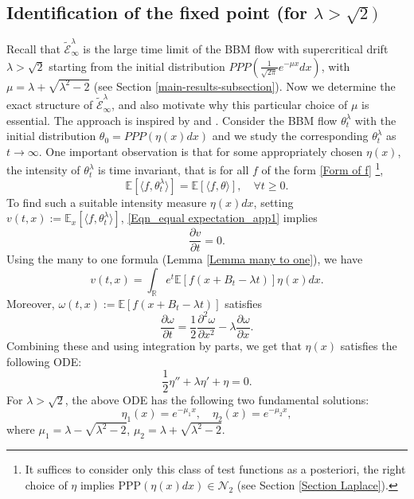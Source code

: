 \documentclass[a4paper,reqno]{amsart}%
\newcommand{\1}{\mathbf 1}
\theoremstyle{mine}
\numberwithin{theorem}{section}
\numberwithin{equation}{section}
\theoremstyle{remark}
\begin{document}
\subsection{Identification of the fixed point (for $\lambda>\sqrt 2)$}\label{sec3}
Recall that $\widetilde{\mathcal E}_\infty^\lambda$ is the large time limit of the BBM flow with supercritical drift $\lambda>\sqrt 2$ starting from the initial distribution  $ PPP(\frac{1}{\sqrt{2\pi}}e^{-\mu x } dx)$, with $\mu=\lambda+\sqrt{\lambda^2-2}$ (see Section \ref{main-results-subsection}). 
Now we determine the exact structure of $\widetilde{\mathcal E}_\infty^\lambda$, and also motivate why this particular choice of $\mu$ is essential.
The approach is inspired by \cite{Lalley_Sellke} and \cite{Kabluchko}. 
Consider the BBM flow $\theta_t^\lambda$ with the initial distribution $\theta_0= PPP(\eta(x)dx)$ and we study the corresponding $\theta^\lambda_{t}$ as $t\to\infty$.
One important observation is that for some appropriately chosen $\eta(x)$, the intensity of $\theta^\lambda_t$ is time invariant, that is 
for all $f$ of the form \eqref{Form of f} \footnote{It suffices to consider only this class of test functions as a posteriori, the right choice of $\eta$ implies PPP$(\eta(x)dx)\in \mathcal N_2$ (see Section \ref{Section Laplace}).},
\begin{equation}\label{Eqn_equal expectation_app1}
  \mathbb{E} [\langle f,\theta_{t}^{\lambda}\rangle] = \mathbb{E} [\langle f, \theta\rangle ], \quad \forall t \ge 0.
\end{equation}
To find such a suitable intensity measure $\eta(x)dx$, setting $v(t,x) := \mathbb{E}_x [\langle f, \theta_{t}^{\lambda}\rangle ]$, \eqref{Eqn_equal expectation_app1} implies
\begin{equation}\label{3.3'}
  \frac{\partial v}{\partial t} = 0.
\end{equation}
Using the many to one formula (Lemma \ref{Lemma many to one}), we have 
\begin{equation}
  v(t,x) = \int_{\mathbb{R}}e^{t}\mathbb{E}[f(x+B_{t}-\lambda t)]\eta(x)dx.
\end{equation}
Moreover, $\omega(t,x) := \mathbb{E}[f(x+B_{t}-\lambda t)]$ satisfies
\begin{equation}
  \frac{\partial \omega}{\partial t} = \frac{1}{2} \frac{\partial^2\omega}{\partial x^2} -\lambda\frac{\partial \omega}{\partial x} .
\end{equation}
Combining these and using integration by parts, we get that $\eta(x)$ satisfies the following ODE:
 \begin{equation}
  \frac{1}{2}\eta'' + \lambda\eta' + \eta = 0.
 \end{equation}
 For $\lambda>\sqrt{2}$, the above ODE has the following two fundamental solutions:
\[ \eta_{1}(x) = e^{-\mu_{1}x}, \quad  \eta_{2}(x) = e^{-\mu_{2}x},\]
where $\mu_{1} = \lambda-\sqrt{\lambda^{2}-2}$, $\mu_{2} = \lambda+\sqrt{\lambda^{2}-2}$. 
\end{document}
